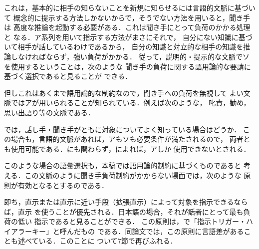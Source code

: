 これは，基本的に相手の知らないことを新規に知らせるには言語的文脈に基づいて
概念的に提示する方法しかないからで，そうでない方法を用いると，聞き手は
高度な推論を起動する必要がある．これは聞き手にとって負荷のかかる処理と
なる．ア系列を用いて指示する方法がまさにそれで，
自分にない知識に基づいて相手が話しているわけであるから，
自分の知識と対立的な相手の知識を推論しなければならず，強い負荷がかかる．
従って，説明的・提示的な文脈でソを使用するということは，次のような
聞き手の負荷に関する語用論的な要請に基づく選択であると見ることが
できる．


但しこれはあくまで語用論的な制約なので，聞き手への負荷を無視して
よい文脈ではアが用いられることが知られている．例えば次のような，
叱責，勧め，思い出語り等の文脈である\cite{kuroda,yosimoto86}．




では，話し手・聞き手がともに対象についてよく知っている場合はどうか．
この場合も，言語的文脈があれば，アもソも必要条件が満たされるので，
両者とも使用可能である．にも関わらず，によれば，アしか
使用できないとされる．


このような場合の語彙選択も，本稿では語用論的制約に基づくものであると
考える．この文脈のように聞き手負荷制約がかからない場面では，次のような
原則が有効となるとするのである．


即ち，直示または直示に近い手段（拡張直示）によって対象を指示できるならば，直示
を使うことが優先される．日本語の場合，それが話者にとって最も負荷の低い
指示であると見ることができる．
この原則は，で「指示トリガー・ハイアラーキー」と呼んだもの
である．同論文では，この原則に言語差があることも述べている．このことに
ついて7節で再びふれる．

